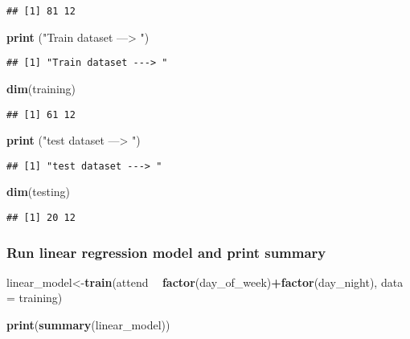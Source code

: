 \documentclass[]{article}
\newenvironment{Shaded}{\begin{snugshade}}{\end{snugshade}}
\newcommand{\DataTypeTok}[1]{\textcolor[rgb]{0.13,0.29,0.53}{#1}}
\newcommand{\KeywordTok}[1]{\textcolor[rgb]{0.13,0.29,0.53}{\textbf{#1}}}
\newcommand{\NormalTok}[1]{#1}
\newcommand{\OperatorTok}[1]{\textcolor[rgb]{0.81,0.36,0.00}{\textbf{#1}}}
\newcommand{\StringTok}[1]{\textcolor[rgb]{0.31,0.60,0.02}{#1}}
\begin{document}
\begin{verbatim}
## [1] 81 12
\end{verbatim}

\begin{Shaded}
\begin{Highlighting}[]
\KeywordTok{print}\NormalTok{ (}\StringTok{"Train dataset ---> "}\NormalTok{)}
\end{Highlighting}
\end{Shaded}

\begin{verbatim}
## [1] "Train dataset ---> "
\end{verbatim}

\begin{Shaded}
\begin{Highlighting}[]
\KeywordTok{dim}\NormalTok{(training)}
\end{Highlighting}
\end{Shaded}

\begin{verbatim}
## [1] 61 12
\end{verbatim}

\begin{Shaded}
\begin{Highlighting}[]
\KeywordTok{print}\NormalTok{ (}\StringTok{"test dataset ---> "}\NormalTok{)}
\end{Highlighting}
\end{Shaded}

\begin{verbatim}
## [1] "test dataset ---> "
\end{verbatim}

\begin{Shaded}
\begin{Highlighting}[]
\KeywordTok{dim}\NormalTok{(testing)}
\end{Highlighting}
\end{Shaded}

\begin{verbatim}
## [1] 20 12
\end{verbatim}

\hypertarget{run-linear-regression-model-and-print-summary}{%
\subsubsection{Run linear regression model and print
summary}\label{run-linear-regression-model-and-print-summary}}

\begin{Shaded}
\begin{Highlighting}[]
\NormalTok{linear_model<-}\KeywordTok{train}\NormalTok{(attend }\OperatorTok{~}\StringTok{ }\KeywordTok{factor}\NormalTok{(day_of_week)}\OperatorTok{+}\KeywordTok{factor}\NormalTok{(day_night), }\DataTypeTok{data =}\NormalTok{ training)}

\KeywordTok{print}\NormalTok{(}\KeywordTok{summary}\NormalTok{(linear_model))}
\end{Highlighting}
\end{Shaded}
\end{document}
